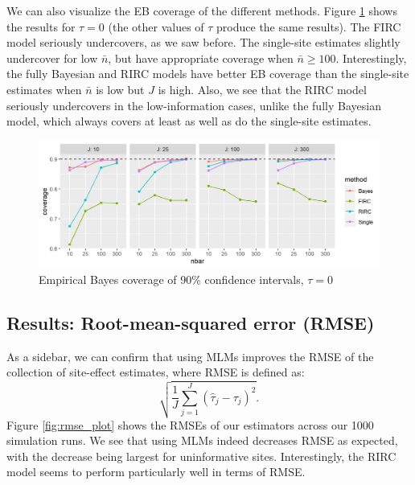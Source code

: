 \documentclass[]{article}
\begin{document}
We can also visualize the EB coverage of the different methods.
Figure \ref{fig:EBcoverage_plot} shows the results for $\tau=0$ (the other values of $\tau$ produce the same results).
The FIRC model seriously undercovers, as we saw before.
The single-site estimates slightly undercover for low $\bar{n}$, but have appropriate coverage when $\bar{n} \geq 100$.
Interestingly, the fully Bayesian and RIRC models have better EB coverage than the single-site estimates when $\bar{n}$ is low but $J$ is high.
Also, we see that the RIRC model seriously undercovers in the low-information cases, unlike the fully Bayesian model, which always covers at least as well as do the single-site estimates.

\begin{figure}[ht]
	\centering
	\includegraphics[width=\textwidth]{coverage_plot_eb}
	\caption{Empirical Bayes coverage of 90\% confidence intervals, $\tau=0$}
	\label{fig:EBcoverage_plot}
\end{figure}


\subsection{Results: Root-mean-squared error (RMSE)}

As a sidebar, we can confirm that using MLMs improves the RMSE of the collection of site-effect estimates, where RMSE is defined as:
$$\sqrt{\frac{1}{J} \sum_{j=1}^J (\hat{\tau}_j - \tau_j)^2}.$$
Figure \ref{fig:rmse_plot} shows the RMSEs of our estimators across our 1000 simulation runs.
We see that using MLMs indeed decreases RMSE as expected, with the decrease being largest for uninformative sites.
Interestingly, the RIRC model seems to perform particularly well in terms of RMSE.
\end{document}
